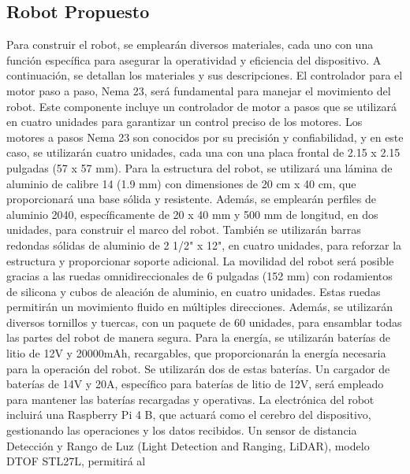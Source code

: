 \subsection{Robot Propuesto} %
\label{sub:Robot Propuesto}
    Para construir el robot, se emplear\'an diversos materiales, cada uno con una funci\'on espec\'ifica para asegurar 
        la operatividad y eficiencia del dispositivo. A continuaci\'on, se detallan los materiales y sus descripciones.
    \vskip 0.5cm
    El controlador para el motor paso a paso, Nema 23, ser\'a fundamental para manejar el movimiento del robot. 
        Este componente incluye un controlador de motor a pasos que se utilizar\'a en cuatro unidades para garantizar 
        un control preciso de los motores. Los motores a pasos Nema 23 son conocidos por su precisi\'on y confiabilidad, 
        y en este caso, se utilizar\'an cuatro unidades, cada una con una placa frontal de 2.15 x 2.15 pulgadas (57 x 57 mm).
    \vskip 0.5cm
    Para la estructura del robot, se utilizar\'a una l\'amina de aluminio de calibre 14 (1.9 mm) con dimensiones de 20 cm x 40 cm, 
        que proporcionar\'a una base s\'olida y resistente. Adem\'as, se emplear\'an perfiles de aluminio 2040, espec\'ificamente de 20 x 
        40 mm y 500 mm de longitud, en dos unidades, para construir el marco del robot. Tambi\'en se utilizar\'an barras redondas 
        s\'olidas de aluminio de 2 1/2" x 12", en cuatro unidades, para reforzar la estructura y proporcionar soporte adicional.
    \vskip 0.5cm
    La movilidad del robot ser\'a posible gracias a las ruedas omnidireccionales de 6 pulgadas (152 mm) con rodamientos de silicona 
        y cubos de aleaci\'on de aluminio, en cuatro unidades. Estas ruedas permitir\'an un movimiento fluido en m\'ultiples direcciones. 
        Adem\'as, se utilizar\'an diversos tornillos y tuercas, con un paquete de 60 unidades, para ensamblar todas las partes del 
        robot de manera segura.
    \vskip 0.5cm
    Para la energ\'ia, se utilizar\'an bater\'ias de litio de 12V y 20000mAh, recargables, que proporcionar\'an la energ\'ia necesaria 
        para la operaci\'on del robot. Se utilizar\'an dos de estas bater\'ias. Un cargador de bater\'ias de 14V y 20A, espec\'ifico 
        para bater\'ias de litio de 12V, ser\'a empleado para mantener las bater\'ias recargadas y operativas.
    \vskip 0.5cm
    La electr\'onica del robot incluir\'a una Raspberry Pi 4 B, que actuar\'a como el cerebro del dispositivo, gestionando 
        las operaciones y los datos recibidos. Un sensor de distancia Detecci\'on y Rango de Luz (Light Detection and Ranging, LiDAR), modelo DTOF STL27L, permitir\'a al 
